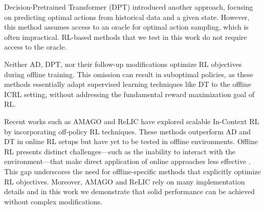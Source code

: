 Decision-Pretrained Transformer (DPT) \citep{lee2024supervised} introduced another approach, focusing on predicting optimal actions from historical data and a given state. However, this method assumes access to an oracle for optimal action sampling, which is often impractical. RL-based methods that we test in this work do not require access to the oracle.

Neither AD, DPT, nor their follow-up modifications \citep{sinii2023context, schmied2024retrieval, dai2024context, huang2024context, sondistilling, zisman2024n} optimize RL objectives during offline training. This omission can result in suboptimal policies, as these methods essentially adapt supervised learning techniques like DT to the offline ICRL setting, without addressing the fundamental reward maximization goal of RL.

Recent works such as AMAGO \citep{grigsby2023amago} and ReLIC \citep{elawady2024relic} have explored scalable In-Context RL by incorporating off-policy RL techniques. These methods outperform AD and DT in online RL setups but have yet to be tested in offline environments. Offline RL presents distinct challenges—such as the inability to interact with the environment—that make direct application of online approaches less effective \citep{fujimoto2019off, levine2020offline}. This gap underscores the need for offline-specific methods that explicitly optimize RL objectives.  Moreover, AMAGO and ReLIC rely on many implementation details and in this work we demonstrate that solid performance can be achieved without complex modifications.
